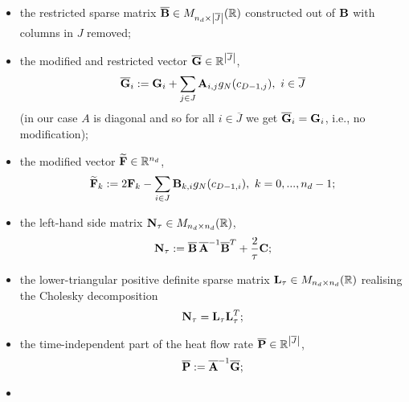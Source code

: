 \begin{algorithm}
\begin{enumerate}
\begin{itemize}
          $\overline{\bf A} \in
            M_{\abs{\overline{J}} \times \abs{\overline{J}}}(\R)$
          constructed out of ${\bf A}$ with rows and columns in $J$ removed;
        \item
          the restricted sparse matrix
          $\overline{\bf B} \in M_{n_d \times \left\lvert\overline{J}\right\rvert}(\mathbb{R})$
          constructed out of ${\bf B}$ with columns in $J$ removed;
        \item
          the modified and restricted vector
          $\overline{\bf G} \in \mathbb{R}^{\left\lvert\overline{J}\right\rvert}$,
          \begin{equation}
            \overline{\bf G}_i :=
            {\bf G}_i
            + \sum_{j \in J} {\bf A}_{i, j} g_N(c_{D - 1, j}),\
            i \in \overline{J}
          \end{equation}
          (in our case  $A$ is diagonal and so for all $i \in \overline{J}$
          we get $\overline{\bf G}_i = {\bf G}_i$, i.e., no modification);
        \item
          the modified vector $\widetilde{\bf F} \in \mathbb{R}^{n_d}$,
          \begin{equation}
            \widetilde{\bf F}_k
            := 2 {\bf F}_k
              - \sum_{i \in J} {\bf B}_{k, i} g_N(c_{D - 1, i}),\
            k = 0, ..., n_d - 1;
          \end{equation}
        \item
          the left-hand side matrix ${\bf N}_\tau \in M_{n_d \times n_d}(\mathbb{R})$,
          \begin{equation}
            {\bf N}_\tau
            := \overline{\bf B}\, \overline{\bf A}^{-1} \overline{\bf B}^T
              + \frac{2}{\tau} {\bf C};
          \end{equation}
        \item
          the lower-triangular positive definite sparse matrix
          ${\bf L}_\tau \in M_{n_d \times n_d}(\mathbb{R})$
          realising the Cholesky decomposition
          \begin{equation}
            {\bf N}_\tau = {\bf L}_\tau {\bf L}^T_\tau;
          \end{equation}
        \item
          the time-independent part of the heat flow rate
          $\overline{\bf P} \in \mathbb{R}^{\left\lvert\overline{J}\right\rvert}$,
          \begin{equation}
            \overline{\bf P} := \overline{\bf A}^{-1} \overline{\bf G};
          \end{equation}
        \item

\end{itemize}
\end{enumerate}
\end{algorithm}
